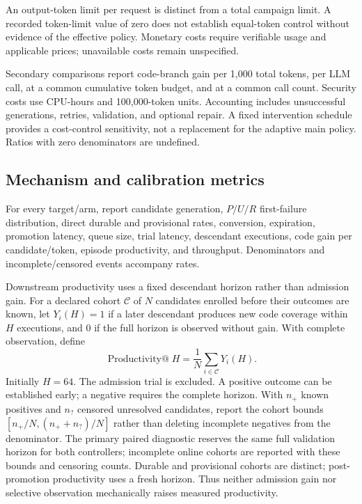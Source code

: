 \documentclass[final,5p,times,number]{elsarticle}
\begin{document}
An output-token limit per request is distinct from a total campaign limit. A recorded token-limit value of zero does not establish equal-token control without evidence of the effective policy. Monetary costs require verifiable usage and applicable prices; unavailable costs remain unspecified.

Secondary comparisons report code-branch gain per 1,000 total tokens, per LLM call, at a common cumulative token budget, and at a common call count. Security costs use CPU-hours and 100,000-token units. Accounting includes unsuccessful generations, retries, validation, and optional repair. A fixed intervention schedule provides a cost-control sensitivity, not a replacement for the adaptive main policy. Ratios with zero denominators are undefined.

\subsection{Mechanism and calibration metrics}
For every target/arm, report candidate generation, $P/U/R$ first-failure distribution, direct durable and provisional rates, conversion, expiration, promotion latency, queue size, trial latency, descendant executions, code gain per candidate/token, episode productivity, and throughput. Denominators and incomplete/censored events accompany rates.

Downstream productivity uses a fixed descendant horizon rather than admission gain. For a declared cohort $\mathcal{C}$ of $N$ candidates enrolled before their outcomes are known, let $Y_i(H)=1$ if a later descendant produces new code coverage within $H$ executions, and $0$ if the full horizon is observed without gain. With complete observation, define
\begin{equation}
\operatorname{Productivity@}H=\frac{1}{N}\sum_{i\in\mathcal{C}}Y_i(H).
\end{equation}
Initially $H=64$. The admission trial is excluded. A positive outcome can be established early; a negative requires the complete horizon. With $n_+$ known positives and $n_?$ censored unresolved candidates, report the cohort bounds $[n_+/N,(n_++n_?)/N]$ rather than deleting incomplete negatives from the denominator. The primary paired diagnostic reserves the same full validation horizon for both controllers; incomplete online cohorts are reported with these bounds and censoring counts. Durable and provisional cohorts are distinct; post-promotion productivity uses a fresh horizon. Thus neither admission gain nor selective observation mechanically raises measured productivity.
\end{document}
